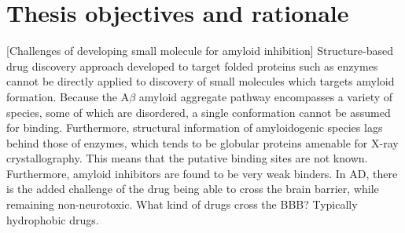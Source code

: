 

\section{Thesis objectives and rationale}

[Challenges of developing small molecule for amyloid inhibition] Structure-based drug discovery approach developed to target folded proteins such as enzymes cannot be directly applied to discovery of small molecules which targets amyloid formation. Because the A$\beta$ amyloid aggregate pathway encompasses a variety of species, some of which are disordered, a single conformation cannot be assumed for binding. Furthermore, structural information of amyloidogenic species lags behind those of enzymes, which tends to be globular proteins amenable for X-ray crystallography. This means that the putative binding sites are not known.  Furthermore, amyloid inhibitors are found to be very weak binders. 
In AD, there is the added challenge of the drug being able to cross the brain barrier, while remaining non-neurotoxic.  What kind of drugs cross the BBB?  Typically hydrophobic drugs.

